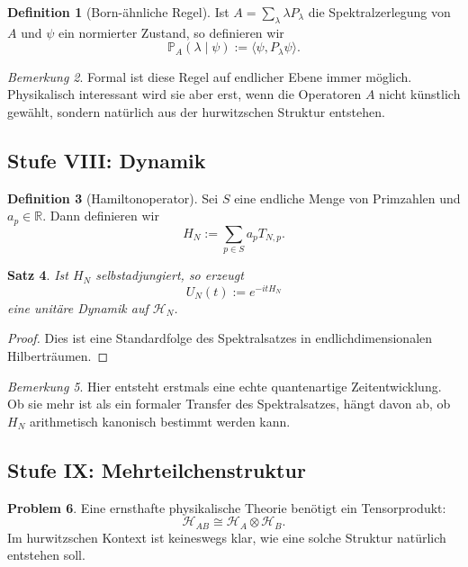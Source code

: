 \documentclass[12pt,a4paper]{article}
\theoremstyle{plain}
\newtheorem{satz}{Satz}[section]
\theoremstyle{definition}
\newtheorem{definition}[satz]{Definition}
\newtheorem{problem}[satz]{Problem}
\theoremstyle{remark}
\newtheorem{bemerkung}[satz]{Bemerkung}
\newcommand{\HN}{\mathcal H_N}
\begin{document}
	\begin{definition}[Born-ähnliche Regel]
		Ist \(A=\sum_\lambda \lambda P_\lambda\) die Spektralzerlegung von \(A\) und \(\psi\) ein
		normierter Zustand, so definieren wir
		\[
		\mathbb P_A(\lambda\mid \psi):=\langle \psi,P_\lambda\psi\rangle.
		\]
	\end{definition}
	
	\begin{bemerkung}
		Formal ist diese Regel auf endlicher Ebene immer möglich. Physikalisch interessant wird
		sie aber erst, wenn die Operatoren \(A\) nicht künstlich gewählt, sondern natürlich aus
		der hurwitzschen Struktur entstehen.
	\end{bemerkung}
	
	\subsection{Stufe VIII: Dynamik}
	
	\begin{definition}[Hamiltonoperator]
		Sei \(S\) eine endliche Menge von Primzahlen und \(a_p\in\mathbb R\). Dann definieren wir
		\[
		H_N := \sum_{p\in S} a_p T_{N,p}.
		\]
	\end{definition}
	
	\begin{satz}
		Ist \(H_N\) selbstadjungiert, so erzeugt
		\[
		U_N(t):=e^{-itH_N}
		\]
		eine unitäre Dynamik auf \(\HN\).
	\end{satz}
	
	\begin{proof}
		Dies ist eine Standardfolge des Spektralsatzes in endlichdimensionalen Hilberträumen.
	\end{proof}
	
	\begin{bemerkung}
		Hier entsteht erstmals eine echte quantenartige Zeitentwicklung. Ob sie mehr ist als ein
		formaler Transfer des Spektralsatzes, hängt davon ab, ob \(H_N\) arithmetisch kanonisch
		bestimmt werden kann.
	\end{bemerkung}
	
	\subsection{Stufe IX: Mehrteilchenstruktur}
	
	\begin{problem}
		Eine ernsthafte physikalische Theorie benötigt ein Tensorprodukt:
		\[
		\mathcal H_{AB} \cong \mathcal H_A \otimes \mathcal H_B.
		\]
		Im hurwitzschen Kontext ist keineswegs klar, wie eine solche Struktur natürlich entstehen
		soll.
	\end{problem}
	
\end{document}
